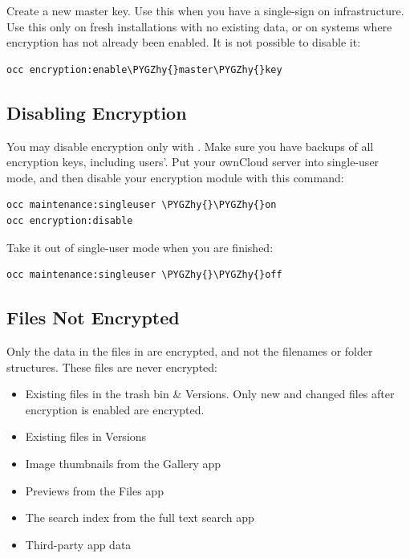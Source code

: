 \documentclass[letterpaper,10pt,english]{sphinxmanual}
\def\PYGZhy{\char`\-}
\begin{document}
Create a new master key. Use this when you have a single-sign on
infrastructure.  Use this only on fresh installations with no existing data, or
on systems where encryption has not already been enabled. It is not possible to
disable it:

\begin{Verbatim}[commandchars=\\\{\}]
occ encryption:enable\PYGZhy{}master\PYGZhy{}key
\end{Verbatim}


\subsection{Disabling Encryption}
\label{configuration_files/encryption_configuration:disabling-encryption}
You may disable encryption only with . Make sure you have backups of all
encryption keys, including users'. Put your ownCloud server into
single-user mode, and then disable your encryption module with this command:

\begin{Verbatim}[commandchars=\\\{\}]
occ maintenance:singleuser \PYGZhy{}\PYGZhy{}on
occ encryption:disable
\end{Verbatim}

Take it out of single-user mode when you are finished:

\begin{Verbatim}[commandchars=\\\{\}]
occ maintenance:singleuser \PYGZhy{}\PYGZhy{}off
\end{Verbatim}


\subsection{Files Not Encrypted}
\label{configuration_files/encryption_configuration:files-not-encrypted}
Only the data in the files in  are encrypted, and not the
filenames or folder structures. These files are never encrypted:
\begin{itemize}
\item {} 
Existing files in the trash bin \& Versions. Only new and changed files after
encryption is enabled are encrypted.

\item {} 
Existing files in Versions

\item {} 
Image thumbnails from the Gallery app

\item {} 
Previews from the Files app

\item {} 
The search index from the full text search app

\item {} 
Third-party app data

\end{itemize}
\end{document}
